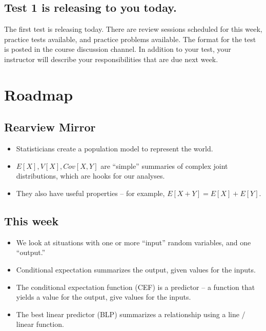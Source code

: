 \documentclass[
]{book}
\providecommand{\tightlist}{%
  \setlength{\itemsep}{0pt}\setlength{\parskip}{0pt}}
\theoremstyle{definition}
\theoremstyle{definition}
\theoremstyle{definition}
\theoremstyle{definition}
\theoremstyle{remark}
\begin{document}
\hypertarget{test-1-is-releasing-to-you-today.}{%
\subsection{Test 1 is releasing to you today.}\label{test-1-is-releasing-to-you-today.}}

The first test is releasing today. There are review sessions scheduled for this week, practice tests available, and practice problems available. The format for the test is posted in the course discussion channel. In addition to your test, your instructor will describe your responsibilities that are due next week.

\hypertarget{roadmap-1}{%
\section{Roadmap}\label{roadmap-1}}

\hypertarget{rearview-mirror}{%
\subsection{Rearview Mirror}\label{rearview-mirror}}

\begin{itemize}
\tightlist
\item
  Statisticians create a population model to represent the world.
\item
  \(E[X], V[X], Cov[X,Y]\) are ``simple'' summaries of complex joint distributions, which are hooks for our analyses.
\item
  They also have useful properties -- for example, \(E[X + Y] = E[X] + E[Y]\).
\end{itemize}

\hypertarget{this-week}{%
\subsection{This week}\label{this-week}}

\begin{itemize}
\tightlist
\item
  We look at situations with one or more ``input'' random variables, and one ``output.''
\item
  Conditional expectation summarizes the output, given values for the inputs.
\item
  The conditional expectation function (CEF) is a predictor -- a function that yields a value for the output, give values for the inputs.
\item
  The best linear predictor (BLP) summarizes a relationship using a line / linear function.
\end{itemize}
\end{document}
